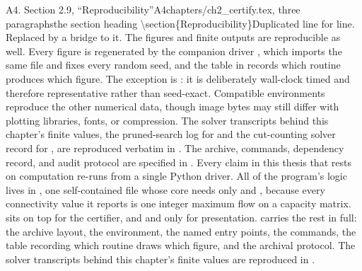 \begin{offcutrewrite}{A4. Section 2.9, ``Reproducibility''}{A4}{chapters/ch2\_certify.tex, three paragraphs}{the section heading \textbackslash{}section\{Reproducibility\}}{Duplicated  line for line. Replaced by a bridge to it.}
The figures and finite outputs are reproducible as well. Every figure is regenerated by the companion driver , which imports the same file and fixes every random seed, and the table in  records which routine produces which figure. The exception is : it is deliberately wall-clock timed and therefore representative rather than seed-exact. Compatible environments reproduce the other numerical data, though image bytes may still differ with plotting libraries, fonts, or compression. The solver transcripts behind this chapter's finite values, the pruned-search log for  and the cut-counting solver record for , are reproduced verbatim in . The archive, commands, dependency record, and audit protocol are specified in .
\nowreads
Every claim in this thesis that rests on computation re-runs from a single Python driver. All of the program's logic lives in , one self-contained file whose core needs only  and , because every connectivity value it reports is one  integer maximum flow on a capacity matrix.  sits on top for the certifier, and  and  only for presentation.  carries the rest in full: the archive layout, the environment, the named entry points, the commands, the table recording which routine draws which figure, and the archival protocol. The solver transcripts behind this chapter's finite values are reproduced in .
\end{offcutrewrite}

